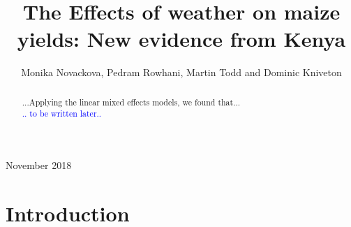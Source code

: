 \documentclass[12pt]{iopart}
\begin{document}
\submitto{\ERL}

\title{The Effects of weather on maize yields: New evidence from Kenya}

\author{Monika Novackova, Pedram Rowhani, Martin Todd and Dominic Kniveton}

\address{Department of Geography, University of Sussex, Falmer, UK}
\vspace{10pt}
\begin{indented}
\item[]November 2018
\end{indented}

\doublespacing
\begin{abstract}
...Applying the linear mixed effects models, we found that...\\
\textcolor{blue}{.. to be written later..}
\end{abstract}

%
%
%
% 
%
\maketitle
\section{Introduction}\label{Introduction}
\end{document}
